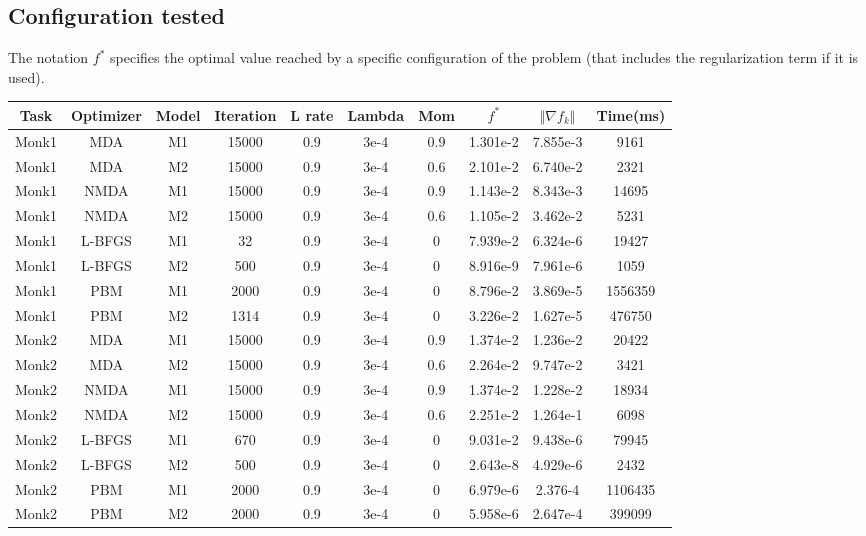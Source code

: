 \subsection{Configuration tested}
The notation $f^*$ specifies the optimal value reached by a specific configuration of the problem (that includes the regularization term if it is used). 

\begin{center}
	\small\addtolength{\tabcolsep}{-3pt}
		\centering
		\begin{longtable}{|c|c|c|c|c|c|c|c|c|c|}
			\hline
			\textbf{Task}& \textbf{Optimizer}&\textbf{Model}&\textbf{Iteration} & \textbf{L rate} & \multicolumn{1}{l|}{\textbf{Lambda}} & \textbf{Mom} & \textbf{$f^{*}$}& \textbf{$\Vert \nabla f_{k}\Vert$ }& \textbf{Time(ms)}\\ \hline 
			Monk1 & MDA & M1 & 15000 & 0.9 & 3e-4  & 0.9 & 1.301e-2  & 7.855e-3 & 9161 \\
			Monk1 & MDA & M2 & 15000 & 0.9 & 3e-4  & 0.6 & 2.101e-2 & 6.740e-2 &  2321\\
			Monk1 & NMDA & M1 & 15000 & 0.9 & 3e-4  & 0.9 & 1.143e-2 & 8.343e-3 & 14695 \\
			Monk1 & NMDA & M2 & 15000 & 0.9 & 3e-4  & 0.6 & 1.105e-2 & 3.462e-2 & 5231 \\
			Monk1 & L-BFGS & M1 & 32 & 0.9 & 3e-4  & 0 &  7.939e-2 & 6.324e-6 & 19427  \\
			Monk1 & L-BFGS & M2 & 500 & 0.9 & 3e-4  & 0 &  8.916e-9 & 7.961e-6 & 1059 \\
			Monk1 & PBM & M1 & 2000 & 0.9 & 3e-4  & 0 & 8.796e-2  & 3.869e-5 & 1556359 \\
			Monk1 & PBM & M2 & 1314 & 0.9 & 3e-4  & 0 & 3.226e-2 & 1.627e-5 & 476750 \\
			
			Monk2 & MDA & M1 & 15000 & 0.9 & 3e-4  & 0.9 & 1.374e-2 & 1.236e-2 & 20422 \\
			Monk2 & MDA & M2 & 15000 & 0.9 & 3e-4  & 0.6 & 2.264e-2 & 9.747e-2 & 3421 \\
			Monk2 & NMDA & M1 & 15000 & 0.9 & 3e-4  & 0.9 &  1.374e-2 & 1.228e-2 & 18934  \\
			Monk2 & NMDA & M2 & 15000 & 0.9 & 3e-4  & 0.6 & 2.251e-2 & 1.264e-1 & 6098 \\
			Monk2 & L-BFGS & M1 & 670 & 0.9 & 3e-4  & 0 & 9.031e-2 & 9.438e-6 & 79945 \\
			Monk2 & L-BFGS & M2 & 500 & 0.9 & 3e-4  & 0 & 2.643e-8 & 4.929e-6 & 2432 \\
			Monk2 & PBM & M1 & 2000 & 0.9 & 3e-4  & 0 & 6.979e-6 & 2.376-4 & 1106435 \\
			Monk2 & PBM & M2 & 2000 & 0.9 & 3e-4  & 0 & 5.958e-6 & 2.647e-4 & 399099 \\
			

\end{longtable}
\end{center}
